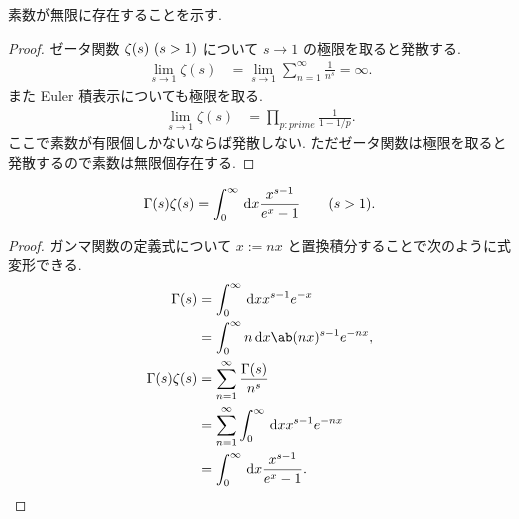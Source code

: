 \documentclass[uplatex,diffipdfmx,a4paper,11pt]{jlreq}
\begin{document}
\begin{proposition}
  素数が無限に存在することを示す.
\end{proposition}
\begin{proof}
  ゼータ関数 $\zeta(s)\ (\real s > 1)$ について $s\to 1$ の極限を取ると発散する.
  \begin{align}
    \lim_{s\to 1}\zeta(s) & = \lim_{s\to 1}\sum_{n=1}^{\infty}\frac{1}{n^s} = \infty.
  \end{align}
  また Euler 積表示についても極限を取る.
  \begin{align}
    \lim_{s\to 1}\zeta(s) & = \prod_{p:prime}\frac{1}{1 - 1/p}.
  \end{align}
  ここで素数が有限個しかないならば発散しない. ただゼータ関数は極限を取ると発散するので素数は無限個存在する.
\end{proof}

\begin{proposition}
  \begin{align}
    \Gamma(s)\zeta(s) = \int_0^\infty\dl{x}\frac{x^{s-1}}{e^x - 1} \qquad (\real s > 1).
  \end{align}
\end{proposition}
\begin{proof}
  ガンマ関数の定義式について $x := nx$ と置換積分することで次のように式変形できる.
  \begin{align}
    \Gamma(s)         & = \int_0^\infty \dl{x}x^{s-1}e^{-x}                     \\
                      & = \int_0^\infty n\dl{x}\ab(nx)^{s-1}e^{-nx},            \\
    \Gamma(s)\zeta(s) & = \sum_{n=1}^{\infty}\frac{\Gamma(s)}{n^s}              \\
                      & = \sum_{n=1}^{\infty}\int_0^\infty \dl{x}x^{s-1}e^{-nx} \\
                      & = \int_0^\infty\dl{x}\frac{x^{s-1}}{e^x - 1}.
  \end{align}
\end{proof}
\end{document}
